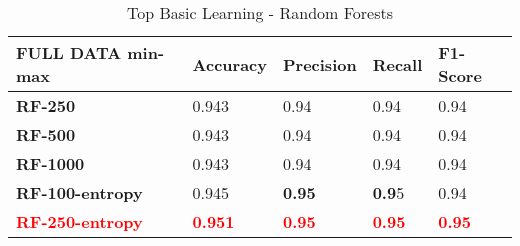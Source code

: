 \documentclass[10pt, conference, compsocconf]{IEEEtran}
\newcommand{\red}[1]{\textcolor{red}{\bf #1}}
\begin{document}
\begin{center}
	\begin{table}[h]
		\centering \footnotesize
		\vspace{0.01cm}
		\caption{Top Basic Learning - Random Forests}
		\hspace{1cm}
		\begin{tabularx}{\linewidth}{ l  X  X  X  X }
			\hline
			\textbf{FULL DATA min-max} &	\textbf{Accuracy}&	\textbf{Precision}&	\textbf{Recall}&	\textbf{F1-Score} \\ \hline
			
			
			\textbf{RF-250}&	0.943&	0.94&	0.94&	0.94\\ \hline
			\textbf{RF-500}&	0.943&	0.94&	0.94&	0.94\\ \hline
			\textbf{RF-1000}&	0.943&	0.94&	0.94&	0.94\\ \hline
			\textbf{RF-100-entropy}&	0.945&	\textbf{0.95}&	\textbf{0.9}5&	0.94\\ \hline
			\red{RF-250-entropy}&	\red{0.951}&	\red{0.95}&	\red{0.95}&	\red{0.95} \\ \hline
			
			
		\end{tabularx}\newline
		\vspace{-0.05cm}
		\label{Table7}
	\end{table} \hfil
\end{center}
\end{document}
